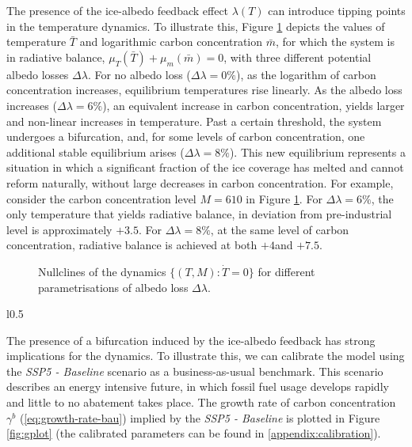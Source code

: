 \documentclass[../../main.tex]{subfiles}
\begin{document}
The presence of the ice-albedo feedback effect $\lambda(T)$ can introduce tipping points in the temperature dynamics.  To illustrate this, Figure \ref{fig:nullclines} depicts the values of temperature $\bar{T}$ and logarithmic carbon concentration $\bar m$, for which the system is in radiative balance, $\mu_T(\bar{T}) + \mu_m(\bar{m}) = 0$, with three different potential albedo losses $\Delta \lambda$. For no albedo loss ($\Delta \lambda = 0\%$), as the logarithm of carbon concentration increases, equilibrium temperatures rise linearly. As the albedo loss increases ($\Delta \lambda = 6\%$), an equivalent increase in carbon concentration, yields larger and non-linear increases in temperature. Past a certain threshold, the system undergoes a bifurcation,  and, for some levels of carbon concentration, one additional stable equilibrium arises ($\Delta \lambda = 8\%$). This new equilibrium represents a situation in which a significant fraction of the ice coverage has melted and cannot reform naturally, without large decreases in carbon concentration. For example, consider the carbon concentration level $M = 610$ in Figure \ref{fig:nullclines}. For $\Delta \lambda = 6\%$, the only temperature that yields radiative balance, in deviation from pre-industrial level is approximately $+3.5$\degree. For $\Delta \lambda = 8\%$, at the same level of carbon concentration, radiative balance is achieved at both $+4$\degree and $+7.5$\degree. 

\begin{figure}[H]
    \centering
    
    \caption{Nullclines of the dynamics $\{(T, M): \dot{T} = 0\}$ for different parametrisations of albedo loss $\Delta \lambda$.}
    \label{fig:nullclines}
\end{figure}

\begin{wrapfigure}{l}{0.5\textwidth}
    
    \caption{}
    \label{fig:gplot}
\end{wrapfigure}
The presence of a bifurcation induced by the ice-albedo feedback has strong implications for the dynamics. To illustrate this, we can calibrate the model using the \textit{SSP5 - Baseline} scenario \citep{kriegler_fossil-fueled_2017} as a business-as-usual benchmark. This scenario describes an energy intensive future, in which fossil fuel usage develops rapidly and little to no abatement takes place. The growth rate of carbon concentration $\gamma^{b}$ (\ref{eq:growth-rate-bau}) implied by the \textit{SSP5 - Baseline} is plotted in Figure \ref{fig:gplot} (the calibrated parameters can be found in \ref{appendix:calibration}).
\end{document}
